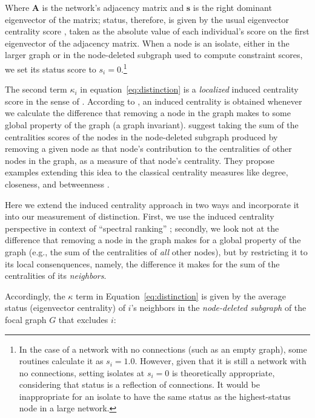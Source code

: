 \documentclass[12pt]{article}
\begin{document}
Where $\mathbf{A}$ is the network's adjacency matrix and $\mathbf{s}$ is the right dominant eigenvector of the matrix; status, therefore, is given by the usual eigenvector centrality score \citep{bonacich1972factoring-03e}, taken as the absolute value of each individual's score on the first eigenvector of the adjacency matrix. When a node is an isolate, either in the larger graph or in the node-deleted subgraph used to compute constraint scores, we set its status score to $s_i =0$.\footnote{In the case of a network with no connections (such as an empty graph), some routines calculate it as $s_i =1.0$. However, given that it is still a network with no connections, setting isolates at $s_i =0$ is theoretically appropriate, considering that status is a reflection of connections. It would be inappropriate for an isolate to have the same status as the highest-status node in a large network.}

The second term $\kappa_i$ in equation~\ref{eq:distinction} is a \textit{localized} induced centrality score in the sense of \citet{borgatti2020oxford-fa6}. According to \citet{everett2010induced-817}, an induced centrality is obtained whenever we calculate the difference that removing a node in the graph makes to some global property of the graph (a graph invariant). \citet{everett2010induced-817} suggest taking the sum of the centralities scores of the nodes in the node-deleted subgraph produced by removing a given node as that node's contribution to the centralities of other nodes in the graph, as a measure of that node's centrality. They propose examples extending this idea to the classical centrality measures like degree, closeness, and betweenness \citep{freeman79}. 

Here we extend the induced centrality approach in two ways and incorporate it into our measurement of distinction. First, we use the induced centrality perspective in context of ``spectral ranking'' \citep{boldi_vigna14}; secondly, we look not at the difference that removing a node in the graph makes for a global property of the graph (e.g., the sum of the centralities of \textit{all} other nodes), but by restricting it to its local consenquences, namely, the difference it makes for the sum of the centralities of its \textit{neighbors}.  

Accordingly, the $\kappa$ term in Equation~\ref{eq:distinction} is given by the average status (eigenvector centrality) of $i$'s neighbors in the \textit{node-deleted subgraph} of the focal graph $G$ that excludes $i$:
\end{document}
